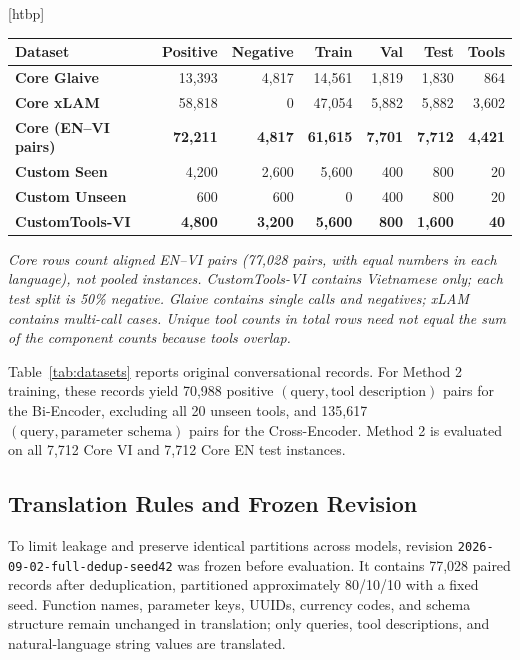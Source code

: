 \documentclass[10pt,twocolumn,a4paper]{article}
\makeatletter
\renewenvironment{table}{\@dblfloat{table}}{\end@dblfloat}
\newcommand{\tabletext}{\small}
\makeatother
\begin{document}
\begin{table}[htbp]
    \centering
    \caption{Training and evaluation split statistics.}
    \label{tab:datasets}
    \tabletext
    \begin{tabular*}{\textwidth}{@{\extracolsep{\fill}}lrrrrrr@{}}
        \toprule
        \textbf{Dataset} & \textbf{Positive} & \textbf{Negative} & \textbf{Train} & \textbf{Val} & \textbf{Test} & \textbf{Tools} \\
        \midrule
        \textbf{Core Glaive} & 13,393 & 4,817 & 14,561 & 1,819 & 1,830 & 864 \\
        \textbf{Core xLAM} & 58,818 & 0 & 47,054 & 5,882 & 5,882 & 3,602 \\
        \textbf{Core (EN--VI pairs)} & \textbf{72,211} & \textbf{4,817} & \textbf{61,615} & \textbf{7,701} & \textbf{7,712} & \textbf{4,421} \\
        \midrule
        \textbf{Custom Seen} & 4,200 & 2,600 & 5,600 & 400 & 800 & 20 \\
        \textbf{Custom Unseen} & 600 & 600 & 0 & 400 & 800 & 20 \\
        \textbf{CustomTools-VI} & \textbf{4,800} & \textbf{3,200} & \textbf{5,600} & \textbf{800} & \textbf{1,600} & \textbf{40} \\
        \bottomrule
    \end{tabular*}
\end{table}

\textit{Core rows count aligned EN--VI pairs (77,028 pairs, with equal numbers in each language), not pooled instances. CustomTools-VI contains Vietnamese only; each test split is 50\% negative. Glaive contains single calls and negatives; xLAM contains multi-call cases. Unique tool counts in total rows need not equal the sum of the component counts because tools overlap.}

Table~\ref{tab:datasets} reports original conversational records. For Method 2 training, these records yield 70,988 positive $(\text{query},\text{tool description})$ pairs for the Bi-Encoder, excluding all 20 unseen tools, and 135,617 $(\text{query},\text{parameter schema})$ pairs for the Cross-Encoder. Method 2 is evaluated on all 7,712 Core VI and 7,712 Core EN test instances.

\subsection{Translation Rules and Frozen Revision}
To limit leakage and preserve identical partitions across models, revision \texttt{2026-09-02-full-dedup-seed42} was frozen before evaluation. It contains 77,028 paired records after deduplication, partitioned approximately 80/10/10 with a fixed seed. Function names, parameter keys, UUIDs, currency codes, and schema structure remain unchanged in translation; only queries, tool descriptions, and natural-language string values are translated.
\end{document}
